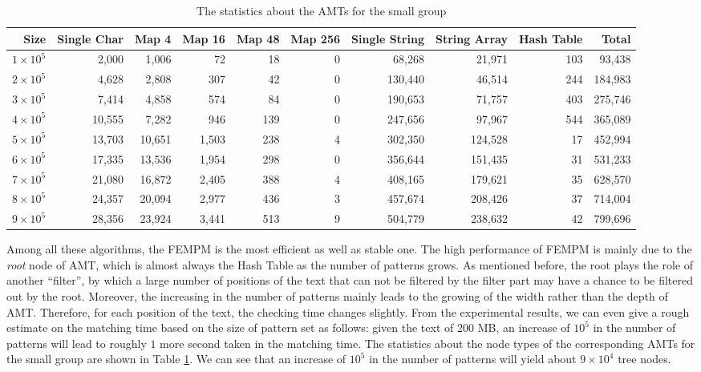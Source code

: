 \documentclass{article}
\begin{document}
\begin{table}[!htp]
  \scriptsize
  \caption{The statistics about the AMTs for the small group}
  \label{tab:small}
  \begin{tabular}{rrrrrrrrrr}
 \hline
 Size &
 Single Char &
 Map 4 &
 Map 16 &
 Map 48 &
 Map 256 &
 Single String &
 String Array   &
 Hash Table &
 Total\\
\hline
$1 \times 10^5$  &  2,000 &  1,006 &    72 &  18 & 0 &  68,268 &  21,971 & 103 &  93,438 \\
$2 \times 10^5$ &  4,628 &  2,808 &   307 &  42 & 0 & 130,440 &  46,514 & 244 & 184,983 \\
$3 \times 10^5$ &  7,414 &  4,858 &   574 &  84 & 0 & 190,653 &  71,757 & 403 & 275,746 \\
$4 \times 10^5$ & 10,555 &  7,282 &   946 & 139 & 0 & 247,656 &  97,967 & 544 & 365,089 \\
$5 \times 10^5$ & 13,703 & 10,651 & 1,503 & 238 & 4 & 302,350 & 124,528 &  17 & 452,994 \\
$6 \times 10^5$ & 17,335 & 13,536 & 1,954 & 298 & 0 & 356,644 & 151,435 &  31 & 531,233 \\
$7 \times 10^5$ & 21,080 & 16,872 & 2,405 & 388 & 4 & 408,165 & 179,621 &  35 & 628,570 \\
$8 \times 10^5$ & 24,357 & 20,094 & 2,977 & 436 & 3 & 457,674 & 208,426 &  37 & 714,004 \\
$9 \times 10^5$ & 28,356 & 23,924 & 3,441 & 513 & 9 & 504,779 & 238,632 &  42 & 799,696 \\
\hline
  \end{tabular}
\end{table}

Among all these algorithms, the \textsf{FEMPM} is the most efficient
as well as stable one. The high performance of \textsf{FEMPM} is
mainly due to the \emph{root} node of AMT, which is almost always the
Hash Table as the number of patterns grows. As mentioned before, the
root plays the role of another ``filter'', by which a large number of
positions of the text that can not be filtered by the filter part may
have a chance to be filtered out by the root. Moreover, the increasing
in the number of patterns mainly leads to the growing of the width
rather than the depth of AMT. Therefore, for each position of the
text, the checking time changes slightly. From the experimental
results, we can even give a rough estimate on the matching time based
on the size of pattern set as follows: given the text of 200 MB, an
increase of $10^5$ in the number of patterns will lead to roughly $1$
more second taken in the matching time. The statistics about the node
types of the corresponding AMTs for the small group are shown in Table
\ref{tab:small}. We can see that an increase of $10^5$ in the number
of patterns will yield about $9 \times 10^4$ tree nodes.
\end{document}

